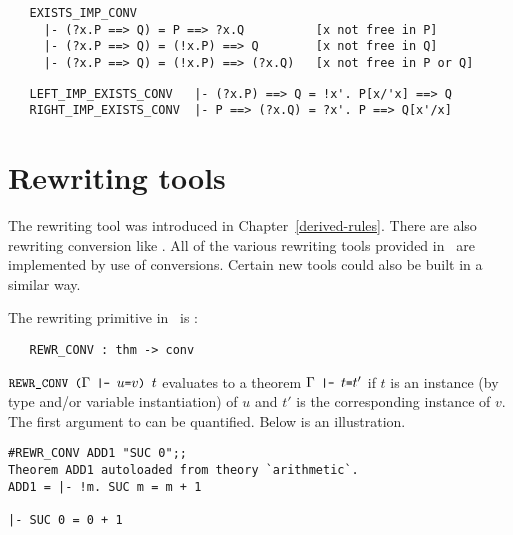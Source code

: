 \begin{hol}\begin{verbatim}
   EXISTS_IMP_CONV
     |- (?x.P ==> Q) = P ==> ?x.Q          [x not free in P]
     |- (?x.P ==> Q) = (!x.P) ==> Q        [x not free in Q]
     |- (?x.P ==> Q) = (!x.P) ==> (?x.Q)   [x not free in P or Q]
\end{verbatim}\end{hol}

\begin{hol}\begin{verbatim}
   LEFT_IMP_EXISTS_CONV   |- (?x.P) ==> Q = !x'. P[x/'x] ==> Q
   RIGHT_IMP_EXISTS_CONV  |- P ==> (?x.Q) = ?x'. P ==> Q[x'/x]
\end{verbatim}\end{hol}


\section{Rewriting tools}
\label{avra3}

The rewriting tool
 was introduced
in Chapter~\ref{derived-rules}.
There are also rewriting conversion like .
All of the various rewriting tools provided in \HOL\
are implemented by use of conversions.
Certain new tools could also be built in a similar way.

The rewriting primitive in \HOL\ is :

\begin{boxed}
\begin{verbatim}
   REWR_CONV : thm -> conv
\end{verbatim}\end{boxed}

\noindent $\ml{REWR\_CONV (}\Gamma\ml{ |- }u \ml{=}v\ml{) }t$ evaluates to a
theorem $\Gamma\ml{ |- }t\ml{=}t'$
if $t$ is an instance (by type and/or variable instantiation)
of $u$ and $t'$ is the corresponding instance of $v$.
The first argument to  can be quantified.
Below is an illustration.

\setcounter{sessioncount}{1}
\begin{session}\begin{verbatim}
#REWR_CONV ADD1 "SUC 0";;
Theorem ADD1 autoloaded from theory `arithmetic`.
ADD1 = |- !m. SUC m = m + 1

|- SUC 0 = 0 + 1
\end{verbatim}\end{session}

